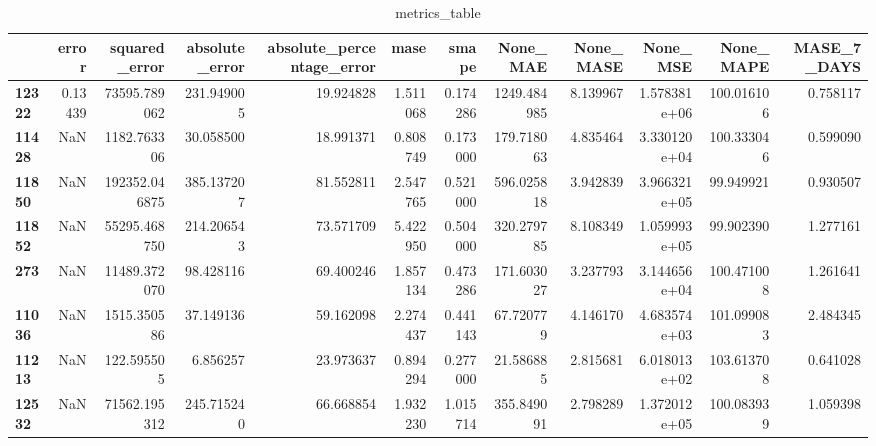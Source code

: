 \begin{table}[h]
\centering
\caption{metrics_table}
\label{table:Final tune for dataset seasonal lstm global multivariate. After smape fix}
\begin{tabular}{lrrrrrrrrrrr}
\toprule
{} &    error &  squared\_error &  absolute\_error &  absolute\_percentage\_error &      mase &     smape &     None\_MAE &  None\_MASE &      None\_MSE &   None\_MAPE &  MASE\_7\_DAYS \\
\midrule
\textbf{12322} &  0.13439 &   73595.789062 &      231.949005 &                  19.924828 &  1.511068 &  0.174286 &  1249.484985 &   8.139967 &  1.578381e+06 &  100.016106 &     0.758117 \\
\textbf{11428} &      NaN &    1182.763306 &       30.058500 &                  18.991371 &  0.808749 &  0.173000 &   179.718063 &   4.835464 &  3.330120e+04 &  100.333046 &     0.599090 \\
\textbf{11850} &      NaN &  192352.046875 &      385.137207 &                  81.552811 &  2.547765 &  0.521000 &   596.025818 &   3.942839 &  3.966321e+05 &   99.949921 &     0.930507 \\
\textbf{11852} &      NaN &   55295.468750 &      214.206543 &                  73.571709 &  5.422950 &  0.504000 &   320.279785 &   8.108349 &  1.059993e+05 &   99.902390 &     1.277161 \\
\textbf{273  } &      NaN &   11489.372070 &       98.428116 &                  69.400246 &  1.857134 &  0.473286 &   171.603027 &   3.237793 &  3.144656e+04 &  100.471008 &     1.261641 \\
\textbf{11036} &      NaN &    1515.350586 &       37.149136 &                  59.162098 &  2.274437 &  0.441143 &    67.720779 &   4.146170 &  4.683574e+03 &  101.099083 &     2.484345 \\
\textbf{11213} &      NaN &     122.595505 &        6.856257 &                  23.973637 &  0.894294 &  0.277000 &    21.586885 &   2.815681 &  6.018013e+02 &  103.613708 &     0.641028 \\
\textbf{12532} &      NaN &   71562.195312 &      245.715240 &                  66.668854 &  1.932230 &  1.015714 &   355.849091 &   2.798289 &  1.372012e+05 &  100.083939 &     1.059398 \\
\bottomrule
\end{tabular}
\end{table}
